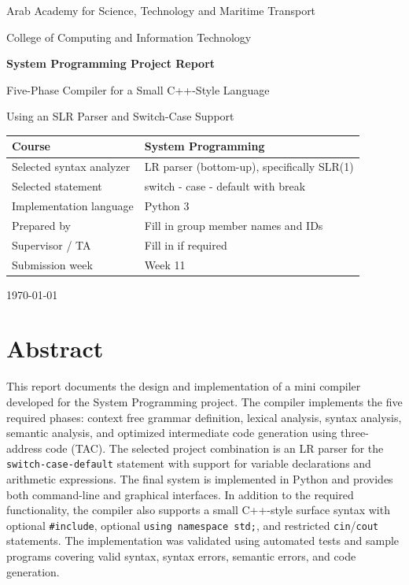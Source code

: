 \documentclass[12pt,a4paper]{article}
\begin{document}
\begin{titlepage}
\centering
{\Large Arab Academy for Science, Technology and Maritime Transport\par}
\vspace{0.4cm}
{\large College of Computing and Information Technology\par}
\vspace{1.6cm}
{\Huge\bfseries System Programming Project Report\par}
\vspace{0.6cm}
{\Large Five-Phase Compiler for a Small C++-Style Language\par}
\vspace{0.3cm}
{\Large Using an SLR Parser and Switch-Case Support\par}
\vspace{1.6cm}

\begin{tabular}{|p{}|p{}|}
\hline
Course & System Programming \\
\hline
Selected syntax analyzer & LR parser (bottom-up), specifically SLR(1) \\
\hline
Selected statement & switch - case - default with break \\
\hline
Implementation language & Python 3 \\
\hline
Prepared by & Fill in group member names and IDs \\
\hline
Supervisor / TA & Fill in if required \\
\hline
Submission week & Week 11 \\
\hline
\end{tabular}

\vfill
{\large \today\par}
\end{titlepage}

\tableofcontents
\clearpage
{}

\section{Abstract}
This report documents the design and implementation of a mini compiler developed for the System Programming project. The compiler implements the five required phases: context free grammar definition, lexical analysis, syntax analysis, semantic analysis, and optimized intermediate code generation using three-address code (TAC). The selected project combination is an LR parser for the \texttt{switch-case-default} statement with support for variable declarations and arithmetic expressions. The final system is implemented in Python and provides both command-line and graphical interfaces. In addition to the required functionality, the compiler also supports a small C++-style surface syntax with optional \texttt{\#include}, optional \texttt{using namespace std;}, and restricted \texttt{cin}/\texttt{cout} statements. The implementation was validated using automated tests and sample programs covering valid syntax, syntax errors, semantic errors, and code generation.
\end{document}
